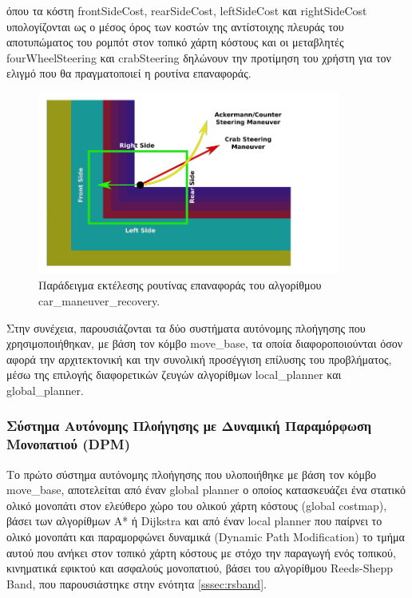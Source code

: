 \bigskip
\noindent
όπου τα κόστη frontSideCost, rearSideCost, leftSideCost και rightSideCost υπολογίζονται ως ο μέσος όρος των κοστών της αντίστοιχης πλευράς του αποτυπώματος του ρομπότ στον τοπικό χάρτη κόστους και οι μεταβλητές fourWheelSteering και crabSteering δηλώνουν την προτίμηση του χρήστη για τον ελιγμό που θα πραγματοποιεί η ρουτίνα επαναφοράς.

\begin{figure}[!ht]
	\centering
	\includegraphics[height=6cm]{Chapters/Chapter4/Figures/car_maneuver_recovery_example.png}
	\caption{Παράδειγμα εκτέλεσης ρουτίνας επαναφοράς του αλγορίθμου car{\_}maneuver{\_}recovery.}
	\label{fig:car_maneuver_recovery_example}
\end{figure}


\bigskip
Στην συνέχεια, παρουσιάζονται τα δύο συστήματα αυτόνομης πλοήγησης που χρησιμοποιήθηκαν, με βάση τον κόμβο move{\_}base, τα οποία διαφοροποιούνται όσον αφορά την αρχιτεκτονική και την συνολική προσέγγιση επίλυσης του προβλήματος, μέσω της επιλογής διαφορετικών ζευγών αλγορίθμων local{\_}planner και global{\_}planner.
	
\subsubsection{Σύστημα Αυτόνομης Πλοήγησης με Δυναμική Παραμόρφωση Μονοπατιού (DPM)}
Το πρώτο σύστημα αυτόνομης πλοήγησης που υλοποιήθηκε με βάση τον κόμβο move{\_}base, αποτελείται από έναν global planner ο οποίος κατασκευάζει ένα στατικό ολικό μονοπάτι στον ελεύθερο χώρο του ολικού χάρτη κόστους (global costmap), βάσει των αλγορίθμων A* ή Dijkstra και από έναν local planner που παίρνει το ολικό μονοπάτι και παραμορφώνει δυναμικά (Dynamic Path Modification) το τμήμα αυτού που ανήκει στον τοπικό χάρτη κόστους με στόχο την παραγωγή ενός τοπικού, κινηματικά εφικτού και ασφαλούς μονοπατιού, βάσει του αλγορίθμου Reeds-Shepp Band, που παρουσιάστηκε στην ενότητα \ref{sssec:rsband}.

